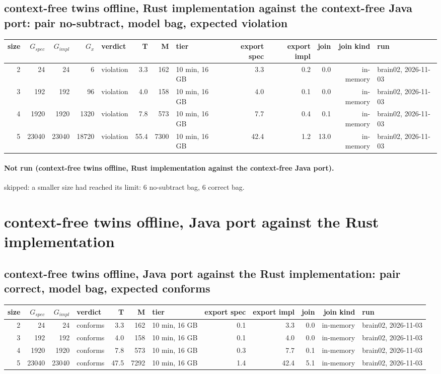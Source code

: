 \documentclass[10pt]{article}
\begin{document}
\subsection*{context-free twins offline, Rust implementation against the context-free Java port: pair \textsf{no-subtract}, model bag, expected violation}
\begin{longtable}{@{}rrrrlrrlrrrrl@{}}
\toprule
size & $G_{\mathit{spec}}$ & $G_{\mathit{impl}}$ & $G_x$ & verdict & T & M & tier & export spec & export impl & join & join kind & run \\
\midrule
\endhead
\color{red} 2 & 24 & 24 & 6 & violation & 3.3 & 162 & 10 min, 16 GB & 3.3 & 0.2 & 0.0 & in-memory & brain02, 2026-11-03 \\
\color{red} 3 & 192 & 192 & 96 & violation & 4.0 & 158 & 10 min, 16 GB & 4.0 & 0.1 & 0.0 & in-memory & brain02, 2026-11-03 \\
\color{red} 4 & 1920 & 1920 & 1320 & violation & 7.8 & 573 & 10 min, 16 GB & 7.7 & 0.4 & 0.1 & in-memory & brain02, 2026-11-03 \\
\color{red} 5 & 23040 & 23040 & 18720 & violation & 55.4 & 7300 & 10 min, 16 GB & 42.4 & 1.2 & 13.0 & in-memory & brain02, 2026-11-03 \\
\bottomrule
\end{longtable}
\paragraph{Not run (context-free twins offline, Rust implementation against the context-free Java port).}
skipped: a smaller size had reached its limit: 6 no-subtract bag, 6 correct bag.\par
\section*{context-free twins offline, Java port against the Rust implementation}
\subsection*{context-free twins offline, Java port against the Rust implementation: pair \textsf{correct}, model bag, expected conforms}
\begin{longtable}{@{}rrrlrrlrrrrl@{}}
\toprule
size & $G_{\mathit{spec}}$ & $G_{\mathit{impl}}$ & verdict & T & M & tier & export spec & export impl & join & join kind & run \\
\midrule
\endhead
\color{red} 2 & 24 & 24 & conforms & 3.3 & 162 & 10 min, 16 GB & 0.1 & 3.3 & 0.0 & in-memory & brain02, 2026-11-03 \\
\color{red} 3 & 192 & 192 & conforms & 4.0 & 158 & 10 min, 16 GB & 0.1 & 4.0 & 0.0 & in-memory & brain02, 2026-11-03 \\
\color{red} 4 & 1920 & 1920 & conforms & 7.8 & 573 & 10 min, 16 GB & 0.3 & 7.7 & 0.1 & in-memory & brain02, 2026-11-03 \\
\color{red} 5 & 23040 & 23040 & conforms & 47.5 & 7292 & 10 min, 16 GB & 1.4 & 42.4 & 5.1 & in-memory & brain02, 2026-11-03 \\
\bottomrule
\end{longtable}
\end{document}
